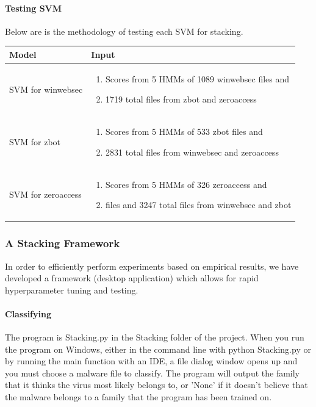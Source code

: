 \documentclass[12pt]{article}
\begin{document}
\paragraph{Testing SVM}
Below are is the methodology of testing each SVM for stacking.
  \begin{table}[H]
    \centering
    \begin{tabular}{|l|p{}|}
    \hline \textbf{Model} & \textbf{Input} \\\hline \hline
    SVM for winwebsec   & 
        \begin{enumerate}
          \item Scores from 5 HMMs of 1089 winwebsec files and 
          \item 1719 total files from zbot and zeroaccess  
        \end{enumerate}  \\\hline
     SVM for zbot   & 
        \begin{enumerate}
          \item Scores from 5 HMMs of 533 zbot files and 
          \item 2831 total files from winwebsec and zeroaccess 
    \end{enumerate} \\\hline
     SVM for zeroaccess
     & 
        \begin{enumerate}
    \item Scores from 5 HMMs of 326 zeroaccess and
    \item files and 3247 total files from winwebsec and zbot          
  \end{enumerate}
  \\\hline
  \end{tabular}
  \end{table}  






  \subsubsection{A Stacking Framework}
  In order to efficiently perform experiments based on empirical results, we have developed a framework (desktop application) which allows for rapid hyperparameter tuning and testing. 

  \paragraph{Classifying}
  The program is Stacking.py in the Stacking folder of the project. When you run the program on Windows, either in the command line with python Stacking.py or by running the main function with an IDE, a file dialog window opens up and you must choose a malware file to classify. The program will output the family that it thinks the virus most likely belongs to, or 'None' if it doesn't believe that the malware belongs to a family that the program has been trained on. 
\end{document}
